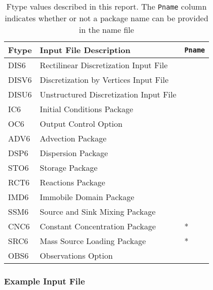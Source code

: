 \begin{table}[H]
\caption{Ftype values described in this report.  The \texttt{Pname} column indicates whether or not a package name can be provided in the name file}
\small
\begin{center}
\begin{tabular*}{\columnwidth}{l l l}
\hline
\hline
Ftype & Input File Description & \texttt{Pname}\\
\hline
DIS6 & Rectilinear Discretization Input File \\
DISV6 & Discretization by Vertices Input File \\
DISU6 & Unstructured Discretization Input File \\
IC6 & Initial Conditions Package \\
OC6 & Output Control Option \\
ADV6 & Advection Package \\ 
DSP6 & Dispersion Package \\ 
STO6 & Storage Package \\
RCT6 & Reactions Package \\
IMD6 & Immobile Domain Package \\
SSM6 & Source and Sink Mixing Package \\ 
CNC6 & Constant Concentration Package & *\\ 
SRC6 & Mass Source Loading Package & * \\ 
OBS6 & Observations Option \\
\hline 
\end{tabular*}
\label{table:ftype}
\end{center}
\normalsize
\end{table}

\vspace{5mm}
\subsubsection{Example Input File}


